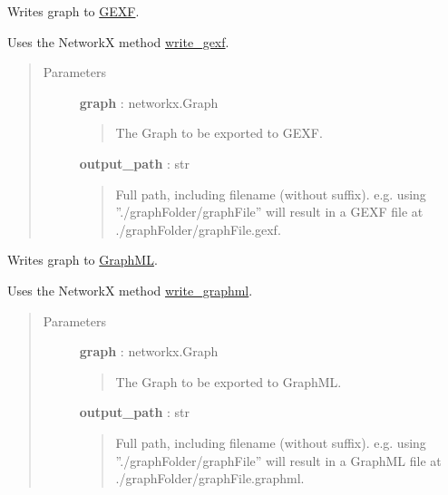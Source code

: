 \documentclass[letterpaper,10pt,english]{sphinxmanual}
\begin{document}

\begin{fulllineitems}
\label{tethne.writers.graph:tethne.writers.graph.to_gexf}
Writes graph to \href{http://gexf.net}{GEXF}.

Uses the NetworkX method
\href{http://networkx.lanl.gov/reference/generated/networkx.readwrite.gexf.write\_gexf.html}{write\_gexf}.
\begin{quote}\begin{description}
\item[{Parameters}] \leavevmode
\textbf{graph} : networkx.Graph
\begin{quote}

The Graph to be exported to GEXF.
\end{quote}

\textbf{output\_path} : str
\begin{quote}

Full path, including filename (without suffix).
e.g. using ''./graphFolder/graphFile'' will result in a GEXF file at
./graphFolder/graphFile.gexf.
\end{quote}

\end{description}\end{quote}

\end{fulllineitems}


\begin{fulllineitems}
\label{tethne.writers.graph:tethne.writers.graph.to_graphml}
Writes graph to \href{http://graphml.graphdrawing.org/}{GraphML}.

Uses the NetworkX method 
\href{http://networkx.lanl.gov/reference/generated/networkx.readwrite.graphml.write\_graphml.html}{write\_graphml}.
\begin{quote}\begin{description}
\item[{Parameters}] \leavevmode
\textbf{graph} : networkx.Graph
\begin{quote}

The Graph to be exported to GraphML.
\end{quote}

\textbf{output\_path} : str
\begin{quote}

Full path, including filename (without suffix).
e.g. using ''./graphFolder/graphFile'' will result in a GraphML file at
./graphFolder/graphFile.graphml.
\end{quote}

\end{description}\end{quote}

\end{fulllineitems}
\end{document}
